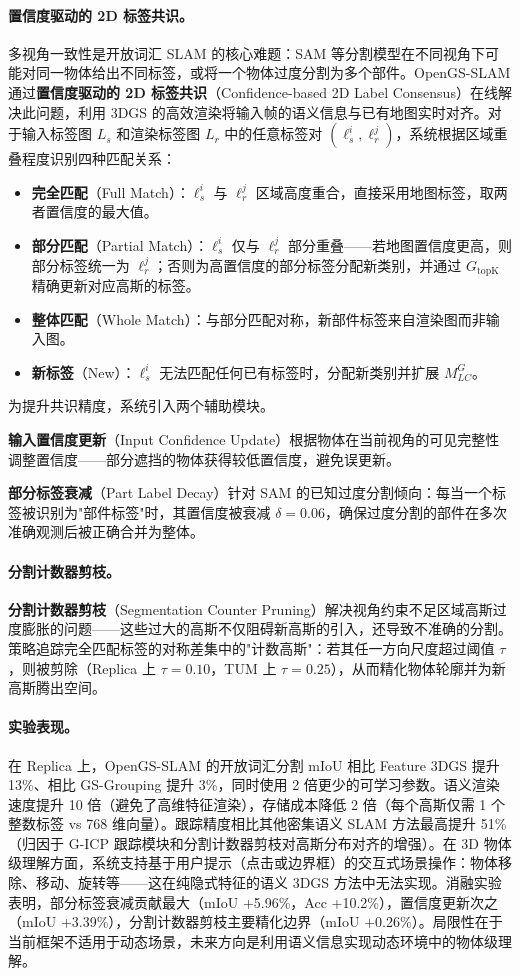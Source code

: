 \paragraph{置信度驱动的 2D 标签共识。}
多视角一致性是开放词汇 SLAM 的核心难题：SAM 等分割模型在不同视角下可能对同一物体给出不同标签，或将一个物体过度分割为多个部件。OpenGS-SLAM 通过\textbf{置信度驱动的 2D 标签共识}（Confidence-based 2D Label Consensus）在线解决此问题，利用 3DGS 的高效渲染将输入帧的语义信息与已有地图实时对齐。对于输入标签图 $L_s$ 和渲染标签图 $L_r$ 中的任意标签对 $(\ell_s^i, \ell_r^j)$，系统根据区域重叠程度识别四种匹配关系：
\begin{itemize}
\item \textbf{完全匹配}（Full Match）：$\ell_s^i$ 与 $\ell_r^j$ 区域高度重合，直接采用地图标签，取两者置信度的最大值。
\item \textbf{部分匹配}（Partial Match）：$\ell_s^i$ 仅与 $\ell_r^j$ 部分重叠——若地图置信度更高，则部分标签统一为 $\ell_r^j$；否则为高置信度的部分标签分配新类别，并通过 $G_{\mathrm{topK}}$ 精确更新对应高斯的标签。
\item \textbf{整体匹配}（Whole Match）：与部分匹配对称，新部件标签来自渲染图而非输入图。
\item \textbf{新标签}（New）：$\ell_s^i$ 无法匹配任何已有标签时，分配新类别并扩展 $M_{LC}^G$。
\end{itemize}
为提升共识精度，系统引入两个辅助模块。

\textbf{输入置信度更新}（Input Confidence Update）根据物体在当前视角的可见完整性调整置信度——部分遮挡的物体获得较低置信度，避免误更新。

\textbf{部分标签衰减}（Part Label Decay）针对 SAM 的已知过度分割倾向：每当一个标签被识别为"部件标签"时，其置信度被衰减 $\delta = 0.06$，确保过度分割的部件在多次准确观测后被正确合并为整体。

\paragraph{分割计数器剪枝。}
\textbf{分割计数器剪枝}（Segmentation Counter Pruning）解决视角约束不足区域高斯过度膨胀的问题——这些过大的高斯不仅阻碍新高斯的引入，还导致不准确的分割。策略追踪完全匹配标签的对称差集中的"计数高斯"：若其任一方向尺度超过阈值 $\tau$，则被剪除（Replica 上 $\tau = 0.10$，TUM 上 $\tau = 0.25$），从而精化物体轮廓并为新高斯腾出空间。

\paragraph{实验表现。}
在 Replica 上，OpenGS-SLAM 的开放词汇分割 mIoU 相比 Feature 3DGS 提升 13\%、相比 GS-Grouping 提升 3\%，同时使用 2 倍更少的可学习参数。语义渲染速度提升 10 倍（避免了高维特征渲染），存储成本降低 2 倍（每个高斯仅需 1 个整数标签 vs 768 维向量）。跟踪精度相比其他密集语义 SLAM 方法最高提升 51\%（归因于 G-ICP 跟踪模块和分割计数器剪枝对高斯分布对齐的增强）。在 3D 物体级理解方面，系统支持基于用户提示（点击或边界框）的交互式场景操作：物体移除、移动、旋转等——这在纯隐式特征的语义 3DGS 方法中无法实现。消融实验表明，部分标签衰减贡献最大（mIoU +5.96\%，Acc +10.2\%），置信度更新次之（mIoU +3.39\%），分割计数器剪枝主要精化边界（mIoU +0.26\%）。局限性在于当前框架不适用于动态场景，未来方向是利用语义信息实现动态环境中的物体级理解。

